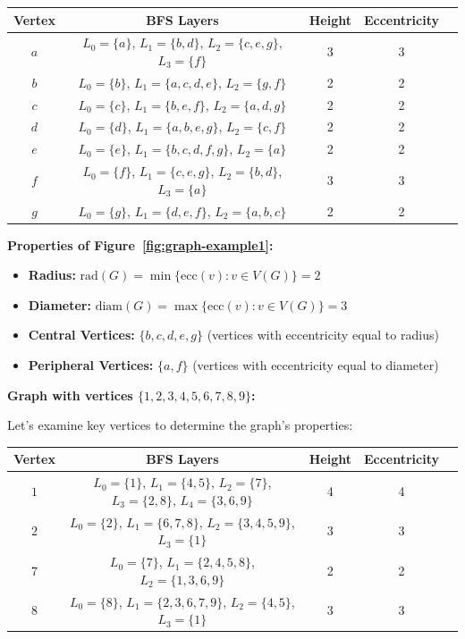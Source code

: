 \documentclass{article}
\theoremstyle{definition}
\begin{document}
\begin{center}
\begin{tabular}{|c|c|c|c|c|}
\hline
\textbf{Vertex} & \textbf{BFS Layers} & \textbf{Height} & \textbf{Eccentricity} \\
\hline
$a$ & $L_0 = \{a\}$, $L_1 = \{b, d\}$, $L_2 = \{c, e, g\}$, $L_3 = \{f\}$ & 3 & 3 \\
\hline
$b$ & $L_0 = \{b\}$, $L_1 = \{a, c, d, e\}$, $L_2 = \{g, f\}$ & 2 & 2 \\
\hline
$c$ & $L_0 = \{c\}$, $L_1 = \{b, e, f\}$, $L_2 = \{a, d, g\}$ & 2 & 2 \\
\hline
$d$ & $L_0 = \{d\}$, $L_1 = \{a, b, e, g\}$, $L_2 = \{c, f\}$ & 2 & 2 \\
\hline
$e$ & $L_0 = \{e\}$, $L_1 = \{b, c, d, f, g\}$, $L_2 = \{a\}$ & 2 & 2 \\
\hline
$f$ & $L_0 = \{f\}$, $L_1 = \{c, e, g\}$, $L_2 = \{b, d\}$, $L_3 = \{a\}$ & 3 & 3 \\
\hline
$g$ & $L_0 = \{g\}$, $L_1 = \{d, e, f\}$, $L_2 = \{a, b, c\}$ & 2 & 2 \\
\hline
\end{tabular}
\end{center}
\noindent\textbf{Properties of Figure~\ref{fig:graph-example1}:}
\begin{itemize}
\item \textbf{Radius:} $\text{rad}(G) = \min\{\text{ecc}(v) : v \in V(G)\} = 2$
\item \textbf{Diameter:} $\text{diam}(G) = \max\{\text{ecc}(v) : v \in V(G)\} = 3$
\item \textbf{Central Vertices:} $\{b, c, d, e, g\}$ (vertices with eccentricity equal to radius)
\item \textbf{Peripheral Vertices:} $\{a, f\}$ (vertices with eccentricity equal to diameter)
\end{itemize}


\noindent\textbf{Graph with vertices $\{1, 2, 3, 4, 5, 6, 7, 8, 9\}$:}

Let's examine key vertices to determine the graph's properties:

\begin{center}
\begin{tabular}{|c|c|c|c|c|}
\hline
\textbf{Vertex} & \textbf{BFS Layers} & \textbf{Height} & \textbf{Eccentricity} \\
\hline
$1$ & $L_0 = \{1\}$, $L_1 = \{4, 5\}$, $L_2 = \{7\}$, $L_3 = \{2, 8\}$, $L_4 = \{3, 6, 9\}$ & 4 & 4 \\
\hline
$2$ & $L_0 = \{2\}$, $L_1 = \{6, 7, 8\}$, $L_2 = \{3, 4, 5, 9\}$, $L_3 = \{1\}$ & 3 & 3 \\
\hline
$7$ & $L_0 = \{7\}$, $L_1 = \{2, 4, 5, 8\}$, $L_2 = \{1, 3, 6, 9\}$ & 2 & 2 \\
\hline
$8$ & $L_0 = \{8\}$, $L_1 = \{2, 3, 6, 7, 9\}$, $L_2 = \{4, 5\}$, $L_3 = \{1\}$ & 3 & 3 \\
\hline
\end{tabular}
\end{center}
\end{document}
